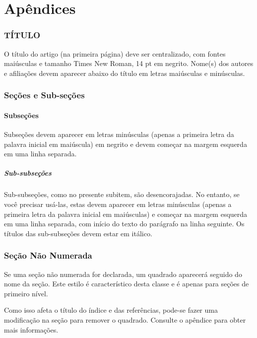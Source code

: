 \documentclass[12pt,a4paper,oneside,linenumbers=off,latinmodern=off,timesnews=off,spanish,english,portuges]{rctart-class/rctart}
\begin{document}
\appendix
\part*{Apêndices}

\section{TÍTULO}

O título do artigo (na primeira página) deve ser centralizado, com fontes maiúsculas e tamanho Times New Roman, 14 pt em negrito. Nome(s) dos autores e afiliações devem aparecer abaixo do título em letras maiúsculas e minúsculas.


\section{Seções e Sub-seções}

 \subsection{Subseções}

Subseções devem aparecer em letras minúsculas (apenas a primeira letra da palavra inicial em maiúscula) em negrito e devem começar na margem esquerda em uma linha separada.

\subsubsection{Sub-subseções}

Sub-subseções, como no presente subitem, são desencorajadas. No entanto, se você precisar usá-las, estas devem aparecer em letras minúsculas (apenas a primeira letra da palavra inicial em maiúsculas) e começar na margem esquerda em uma linha separada, com início do texto do parágrafo na linha seguinte. Os títulos das sub-subseções devem estar em itálico.

\section*{Seção Não Numerada} \label{sec:unsec}

    Se uma seção não numerada for declarada, um quadrado aparecerá seguido do nome da seção. Este estilo é característico desta classe e é apenas para seções de primeiro nível.

    Como isso afeta o título do índice e das referências, pode-se fazer uma modificação na seção   para remover o quadrado. Consulte o apêndice para obter mais informações.
\end{document}
